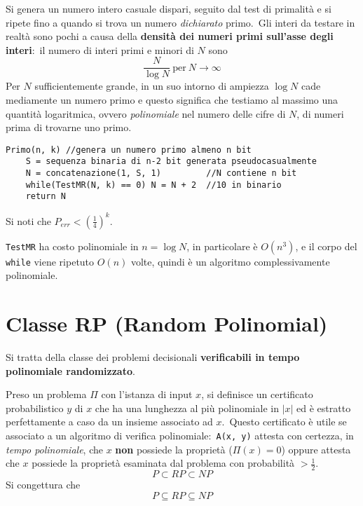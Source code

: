 Si genera un numero intero casuale dispari, seguito dal test di primalità e si ripete fino a quando si trova un numero \textit{dichiarato} primo.\
Gli interi da testare in realtà sono pochi a causa della \textbf{densità dei numeri primi sull'asse degli interi}:\ il numero di interi primi e minori di $N$ sono
\[\frac{N}{\log N}\ \mathrm{per}\ N \to \infty\]
Per $N$ sufficientemente grande, in un suo intorno di ampiezza $\log N$ cade mediamente un numero primo e questo significa che testiamo al massimo una quantità logaritmica, ovvero \textit{polinomiale} nel numero delle cifre di $N$, di numeri prima di trovarne uno primo.\

\begin{verbatim}
Primo(n, k) //genera un numero primo almeno n bit
    S = sequenza binaria di n-2 bit generata pseudocasualmente
    N = concatenazione(1, S, 1)         //N contiene n bit
    while(TestMR(N, k) == 0) N = N + 2  //10 in binario
    return N
\end{verbatim}
Si noti che $P_{err} < \left(\frac{1}{4}\right)^k$.\

\texttt{TestMR} ha costo polinomiale in $n = \log N$, in particolare è $O(n^3)$, e il corpo del \texttt{while} viene ripetuto $O(n)$ volte, quindi è un algoritmo complessivamente polinomiale.\

\section{Classe RP (Random Polinomial)}

Si tratta della classe dei problemi decisionali \textbf{verificabili in tempo polinomiale randomizzato}.\

Preso un problema $\Pi$ con l'istanza di input $x$, si definisce un certificato probabilistico $y$ di $x$ che ha una lunghezza al più polinomiale in $|x|$ ed è estratto perfettamente a caso da un insieme associato ad $x$.\
Questo certificato è utile se associato a un algoritmo di verifica polinomiale:\ \verb|A(x, y)| attesta con certezza, in \textit{tempo polinomiale}, che $x$ \textbf{non} possiede la proprietà ($\Pi(x) =0$) oppure attesta che $x$ possiede la proprietà esaminata dal problema con probabilità $> \frac{1}{2}$.\
\[\mathit{P \subset RP\subset NP}\]
Si congettura che
\[\mathit{P \subseteq RP\subseteq NP}\]
